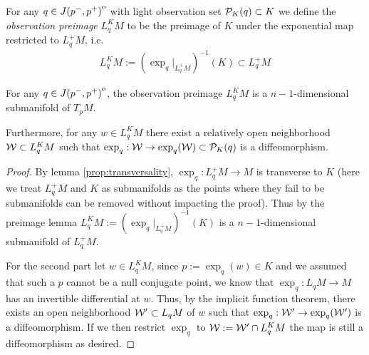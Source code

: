 \begin{definition}
For any $q\in {\kern0ptJ(p^-,p^+)}^{\mathrm{o}}$ with light observation set $\mathcal{P}_K(q)\subset K$ we define the \emph{observation preimage} $L^K_qM$ to be the preimage of $K$ under the exponential map restricted to $L^+_qM$, i.e. 
\begin{align*}
    L^K_qM := (\exp_q\rvert_{L^+_qM})^{-1}(K) \subset L^+_qM
\end{align*}
\end{definition}
\begin{lemma}\label{lem:preimage}
For any $q\in {\kern0ptJ(p^-,p^+)}^{\mathrm{o}}$, the observation preimage $L^K_qM$ is a $n-1$-dimensional submanifold of $T_pM$. 

Furthermore, for any $w\in L^K_qM$ there exist a relatively open neighborhood $\mathcal{W}\subset L^K_qM$ such that $\exp_q:\mathcal{W}\to \exp_q(\mathcal{W})\subset \mathcal{P}_K(q)$ is a diffeomorphism.
\end{lemma}
\begin{proof}
    By lemma \ref{prop:transversality}, $\exp_q:L^+_qM\to M$ is transverse to $K$ (here we treat $L^+_qM$ and $K$ as submanifolds as the points where they fail to be submanifolds can be removed without impacting the proof). Thus by the preimage lemma $ L^K_qM := (\exp_q\rvert_{L^+_qM})^{-1}(K)$ is a $n-1$-dimensional submanifold of $L^+_qM$.

    For the second part let $w\in L^K_qM$, since $p:=\exp_q(w)\in K$ and we assumed that such a $p$ cannot be a null conjugate point, we know that $\exp_q:L_qM\to M$ has an invertible differential at $w$. Thus, by the implicit function theorem, there exists an open neighborhood $\mathcal{W}'\subset L_qM$ of $w$ such that $\exp_q:\mathcal{W}'\to \exp_q(\mathcal{W}')$ is a diffeomorphism. If we then restrict $\exp_q$ to $\mathcal{W}:=\mathcal{W}' \cap L^K_qM$ the map is still a diffeomorphism as desired.
\end{proof}

